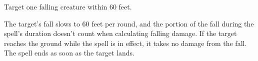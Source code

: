 





Target one falling creature within 60 feet.

The target's fall slows to 60 feet per round, and the portion of the fall during the spell's duration doesn't count when calculating falling damage.
If the target reaches the ground while the spell is in effect, it takes no damage from the fall.
The spell ends as soon as the target lands.
